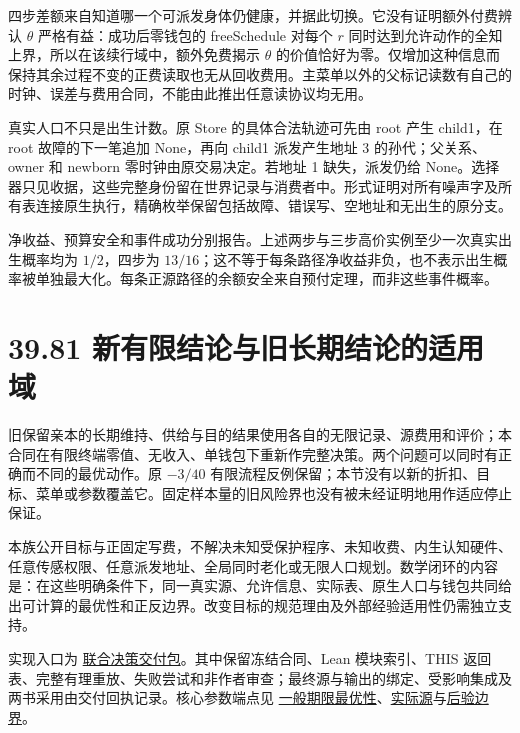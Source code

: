 \documentclass[
  11pt,
  oneside]{book}
\begin{document}
四步差额来自知道哪一个可派发身体仍健康，并据此切换。它没有证明额外付费辨认 \(\theta\) 严格有益：成功后零钱包的 freeSchedule 对每个 \(r\) 同时达到允许动作的全知上界，所以在该续行域中，额外免费揭示 \(\theta\) 的价值恰好为零。仅增加这种信息而保持其余过程不变的正费读取也无从回收费用。主菜单以外的父标记读数有自己的时钟、误差与费用合同，不能由此推出任意读协议均无用。

真实人口不只是出生计数。原 Store 的具体合法轨迹可先由 root 产生 child1，在 root 故障的下一笔追加 None，再向 child1 派发产生地址 3 的孙代；父关系、owner 和 newborn 零时钟由原交易决定。若地址 1 缺失，派发仍给 None。选择器只见收据，这些完整身份留在世界记录与消费者中。形式证明对所有噪声字及所有表连接原生执行，精确枚举保留包括故障、错误写、空地址和无出生的原分支。

净收益、预算安全和事件成功分别报告。上述两步与三步高价实例至少一次真实出生概率均为 \(1/2\)，四步为 \(13/16\)；这不等于每条路径净收益非负，也不表示出生概率被单独最大化。每条正源路径的余额安全来自预付定理，而非这些事件概率。

\section{39.81 新有限结论与旧长期结论的适用域}\label{ux65b0ux6709ux9650ux7ed3ux8bbaux4e0eux65e7ux957fux671fux7ed3ux8bbaux7684ux9002ux7528ux57df}

旧保留亲本的长期维持、供给与目的结果使用各自的无限记录、源费用和评价；本合同在有限终端零值、无收入、单钱包下重新作完整决策。两个问题可以同时有正确而不同的最优动作。原 \(-3/40\) 有限流程反例保留；本节没有以新的折扣、目标、菜单或参数覆盖它。固定样本量的旧风险界也没有被未经证明地用作适应停止保证。

本族公开目标与正固定写费，不解决未知受保护程序、未知收费、内生认知硬件、任意传感权限、任意派发地址、全局同时老化或无限人口规划。数学闭环的内容是：在这些明确条件下，同一真实源、允许信息、实际表、原生人口与钱包共同给出可计算的最优性和正反边界。改变目标的规范理由及外部经验适用性仍需独立支持。

实现入口为 \href{../formalization/ueot-core/docs/compression/theory_completion/unified_closure/joint_decision_closure_v1/README.md}{联合决策交付包}。其中保留冻结合同、Lean 模块索引、THIS 返回表、完整有理重放、失败尝试和非作者审查；最终源与输出的绑定、受影响集成及两书采用由交付回执记录。核心参数端点见 \href{../formalization/ueot-core/UEOT/V3/Compression/TheoryCompletion/UnifiedClosure/RegisterJointDecisionOptimality.lean}{一般期限最优性}、\href{../formalization/ueot-core/UEOT/V3/Compression/TheoryCompletion/UnifiedClosure/RegisterJointDecisionSource.lean}{实际源}与\href{../formalization/ueot-core/UEOT/V3/Compression/TheoryCompletion/UnifiedClosure/RegisterJointDecisionBoundary.lean}{后验边界}。
\end{document}
